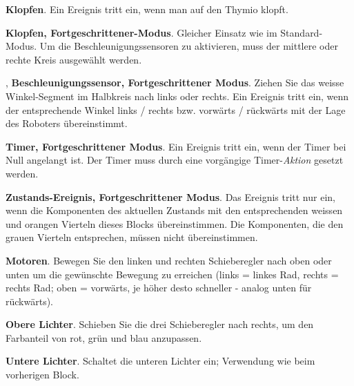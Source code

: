 \bigskip\bigskip\bigskip

 \textbf{Klopfen}. Ein Ereignis tritt ein, wenn man auf den Thymio klopft. 

\bigskip\bigskip\bigskip

 \textbf{Klopfen, Fortgeschrittener-Modus}. Gleicher Einsatz wie im Standard-Modus. Um die Beschleunigungssensoren zu aktivieren, muss der mittlere oder rechte Kreis ausgewählt werden. 

\bigskip\bigskip

,  \textbf{Beschleunigungssensor, Fortgeschrittener Modus}. Ziehen Sie das weisse Winkel-Segment im Halbkreis nach links oder rechts. Ein Ereignis tritt ein, wenn der entsprechende Winkel links / rechts bzw. vorwärts / rückwärts mit der Lage des Roboters übereinstimmt. 

\bigskip\bigskip\bigskip\bigskip

 \textbf{Timer, Fortgeschrittener Modus}. Ein Ereignis tritt ein, wenn der Timer bei Null angelangt ist. Der Timer muss durch eine vorgängige Timer-\emph{Aktion} gesetzt werden.

\bigskip\bigskip\bigskip

 \textbf{Zustands-Ereignis, Fortgeschrittener Modus}. Das Ereignis tritt nur ein, wenn die Komponenten des aktuellen Zustands mit den entsprechenden weissen und orangen Vierteln dieses Blocks übereinstimmen. Die Komponenten, die den grauen Vierteln entsprechen, müssen nicht übereinstimmen. 

\bigskip


 \textbf{Motoren}. Bewegen Sie den linken und rechten Schieberegler nach oben oder unten um die gewünschte Bewegung zu erreichen (links = linkes Rad, rechts = rechts Rad; oben = vorwärts, je höher desto schneller - analog unten für rückwärts). 

\newpage

 \textbf{Obere Lichter}. Schieben Sie die drei Schieberegler nach rechts, um den Farbanteil von rot, grün und blau anzupassen. 

\bigskip\bigskip

 \textbf{Untere Lichter}. Schaltet die unteren Lichter ein; Verwendung wie beim vorherigen Block. 

\bigskip\bigskip

